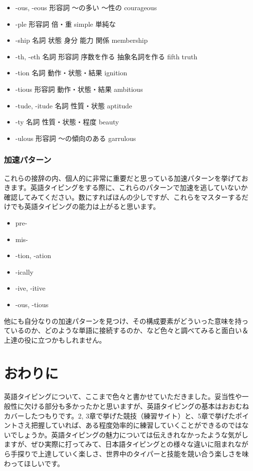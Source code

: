 \begin{itemize}
 \item -ous, -eous 形容詞 ～の多い ～性の courageous
 \item -ple 形容詞 倍・重 simple 単純な
 \item -ship 名詞 状態 身分 能力 関係 membership
 \item -th, -eth 名詞 形容詞 序数を作る 抽象名詞を作る fifth truth
 \item -tion 名詞 動作・状態・結果 ignition
 \item -tious 形容詞 動作・状態・結果 ambitious
 \item -tude, -itude 名詞 性質・状態 aptitude
 \item -ty 名詞 性質・状態・程度 beauty
 \item -ulous 形容詞 ～の傾向のある garrulous
\end{itemize}

\subsubsection*{加速パターン}

これらの接辞の内、個人的に非常に重要だと思っている加速パターンを挙げておきます。英語タイピングをする際に、これらのパターンで加速を逃していないか確認してみてください。数にすればほんの少しですが、これらをマスターするだけでも英語タイピングの能力は上がると思います。

\begin{itemize}
 \item pre-
 \item mis-
 \item -tion, -ation
 \item -ically
 \item -ive, -itive
 \item -ous, -tious
\end{itemize}

他にも自分なりの加速パターンを見つけ、その構成要素がどういった意味を持っているのか、どのような単語に接続するのか、など色々と調べてみると面白い＆上達の役に立つかもしれません。

\section{おわりに}

英語タイピングについて、ここまで色々と書かせていただきました。妥当性や一般性に欠ける部分も多かったかと思いますが、英語タイピングの基本はおおむねカバーしたつもりです。2, 3章で挙げた競技（練習サイト）と、5章で挙げたポイントさえ把握していれば、ある程度効率的に練習していくことができるのではないでしょうか。英語タイピングの魅力については伝えきれなかったような気がしますが、ぜひ実際に打ってみて、日本語タイピングとの様々な違いに阻まれながら手探りで上達していく楽しさ、世界中のタイパーと技能を競い合う楽しさを味わってほしいです。

